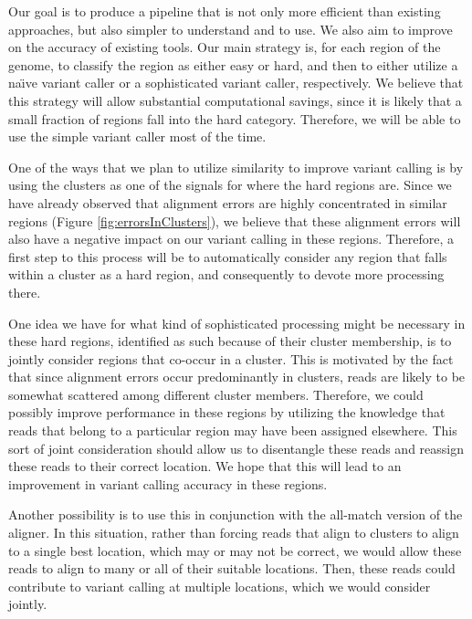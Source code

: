 \documentclass[twocolumn,10pt]{article}
\begin{document}
Our goal is to produce a pipeline that is not only more efficient than existing approaches, but also simpler to understand and to use.  We also aim to improve on the accuracy of existing tools.  Our main strategy is, for each region of the genome, to classify the region as either easy or hard, and then to either utilize a na\"{\i}ve variant caller or a sophisticated variant caller, respectively.  We believe that this strategy will allow substantial computational savings, since it is likely that a small fraction of regions fall into the hard category.  Therefore, we will be able to use the simple variant caller most of the time.

One of the ways that we plan to utilize similarity to improve variant calling is by using the clusters as one of the signals for where the hard regions are.  Since we have already observed that alignment errors are highly concentrated in similar regions (Figure \ref{fig:errorsInClusters}), we believe that these alignment errors will also have a negative impact on our variant calling in these regions.  Therefore, a first step to this process will be to automatically consider any region that falls within a cluster as a hard region, and consequently to devote more processing there.

One idea we have for what kind of sophisticated processing might be necessary in these hard regions, identified as such because of their cluster membership, is to jointly consider regions that co-occur in a cluster.  This is motivated by the fact that since alignment errors occur predominantly in clusters, reads are likely to be somewhat scattered among different cluster members.  Therefore, we could possibly improve performance in these regions by utilizing the knowledge that reads that belong to a particular region may have been assigned elsewhere.  This sort of joint consideration should allow us to disentangle these reads and reassign these reads to their correct location.  We hope that this will lead to an improvement in variant calling accuracy in these regions.

Another possibility is to use this in conjunction with the all-match version of the aligner.  In this situation, rather than forcing reads that align to clusters to align to a single best location, which may or may not be correct, we would allow these reads to align to many or all of their suitable locations.  Then, these reads could contribute to variant calling at multiple locations, which we would consider jointly.
\end{document}
